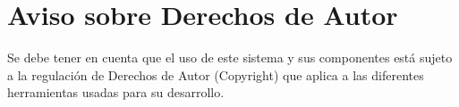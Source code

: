 \section{Aviso sobre Derechos de Autor}
\label{sec:derechosautor}
Se debe tener en cuenta que el uso de este sistema y sus componentes está sujeto a la regulación de Derechos de Autor (Copyright) que aplica a las diferentes herramientas usadas para su desarrollo.
